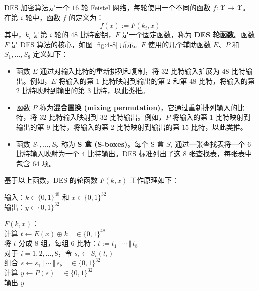 \begin{snote}
DES 加密算法是一个 $16$ 轮 Feistel 网络，每轮使用一个不同的函数 $f:\mathcal{X}\to\mathcal{X}$。在第 $i$ 轮中，函数 $f$ 的定义为：
\[
f(x):=F(k_i,x)
\]
其中，$k_i$ 是第 $i$ 轮的 $48$ 比特密钥，$F$ 是一个固定函数，称为 \textbf{DES 轮函数}。函数 $F$ 是 DES 算法的核心，如图 \ref{fig:4-8} 所示。$F$ 使用的几个辅助函数 $E$、$P$ 和 $S_1,\dots,S_8$ 定义如下：
\begin{itemize}
	\item 函数 $E$ 通过对输入比特的重新排列和复制，将 $32$ 比特输入扩展为 $48$ 比特输出。例如，$E$ 将输入的第 $1$ 比特映射到输出的第 $2$ 和第 $48$ 比特，将输入的第 $2$ 比特映射到输出的第 $3$ 比特，以此类推。
	\item 函数 $P$ 称为\textbf{混合置换 (mixing permutation)}，它通过重新排列输入的比特，将 $32$ 比特输入映射到 $32$ 比特输出。例如，$P$ 将输入的第 $1$ 比特映射到输出的第 $9$ 比特，将输入的第 $2$ 比特映射到输出的第 $15$ 比特，以此类推。
	\item 函数 $S_1,\dots,S_8$ 称为 \textbf{S 盒 (S-boxes)}。每个 S 盒 $S_i$ 通过一张查找表将一个 $6$ 比特输入映射为一个 $4$ 比特输出。DES 标准列出了这 $8$ 张查找表，每张表中包含 $64$ 项。
\end{itemize}

\noindent
基于以上函数，DES 的轮函数 $F(k,x)$ 工作原理如下：

\vspace*{10pt}

\hspace*{5pt} 输入：$k\in\{0,1\}^{48}$ 和 $x\in\{0,1\}^{32}$\\
\hspace*{26pt} 输出：$y\in\{0,1\}^{32}$

\vspace*{5pt}

\hspace*{5pt} $F(k,x)$：\\
\hspace*{50pt} 计算 $t\leftarrow E(x)\oplus k\quad\in\{0,1\}^{48}$\\
\hspace*{50pt} 将 $t$ 分成 $8$ 组，每组 $6$ 比特：$t:=t_1\,\Vert\,\cdots\,\Vert\,t_8$\\
\hspace*{50pt} 对于 $i=1,2,\dots,8$，令 $s_i\leftarrow S_i(t_i)$\\
\hspace*{50pt} 组合 $s\leftarrow s_1\,\Vert\,\cdots\,\Vert\,s_8\quad\in\{0,1\}^{32}$\\
\hspace*{50pt} 计算 $y\leftarrow P(s)\quad\in\{0,1\}^{32}$\\
\hspace*{50pt} 输出 $y$


\end{snote}
